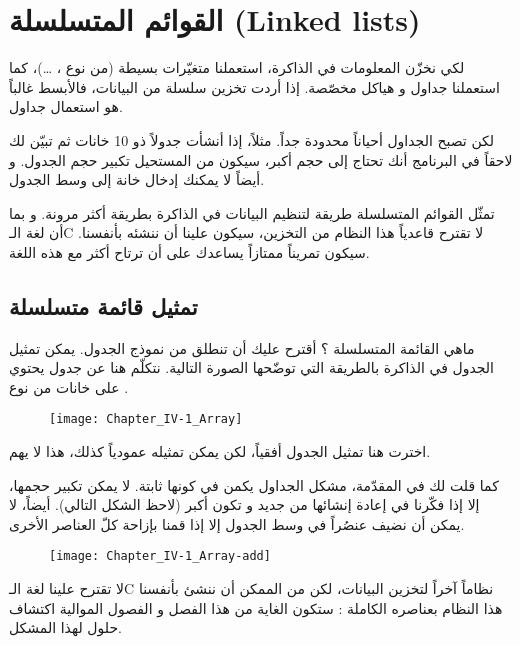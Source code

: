 \chapter{القوائم المتسلسلة (\textenglish{Linked lists})}

لكي نخزّن المعلومات في الذاكرة، استعملنا متغيّرات بسيطة (من نوع
،  \dots)،
كما استعملنا جداول و هياكل مخصّصة. إذا أردت تخزين سلسلة من البيانات، فالأبسط غالباً هو استعمال جداول. 

لكن تصبح الجداول أحياناً محدودة جداً. مثلاً، إذا أنشأت جدولاً ذو 10 خانات ثم تبيّن لك لاحقاً في البرنامج أنك تحتاج إلى حجم أكبر، سيكون من المستحيل تكبير حجم الجدول. و أيضاً لا يمكنك إدخال خانة إلى وسط الجدول.

تمثّل القوائم المتسلسلة طريقة لتنظيم البيانات في الذاكرة بطريقة أكثر مرونة. و بما أن لغة الـ\textenglish{C}
لا تقترح قاعدياً هذا النظام من التخزين، سيكون علينا أن ننشئه بأنفسنا. سيكون تمريناً ممتازاً يساعدك على أن ترتاح أكثر مع هذه اللغة.

\section{تمثيل قائمة متسلسلة}

ماهي القائمة المتسلسلة ؟ أقترح عليك أن تنطلق من نموذج الجدول. يمكن تمثيل الجدول في الذاكرة بالطريقة التي توضّحها الصورة التالية. نتكلّم هنا عن جدول يحتوي على خانات من نوع
.

\begin{figure}[H]
	\centering
	\texttt{[image: Chapter\_IV-1\_Array]}
\end{figure}

\begin{information}
اخترت هنا تمثيل الجدول أفقياً، لكن يمكن تمثيله عمودياً كذلك، هذا لا يهم.
\end{information}


كما قلت لك في المقدّمة، مشكل الجداول يكمن في كونها ثابتة. لا يمكن تكبير حجمها، إلا إذا فكّرنا في إعادة إنشائها من جديد و تكون أكبر (لاحظ الشكل التالي). أيضاً، لا يمكن أن نضيف عنصُراً في وسط الجدول إلا إذا قمنا بإزاحة كلّ العناصر الأخرى.

\begin{figure}[H]
	\centering
	\texttt{[image: Chapter\_IV-1\_Array-add]}
\end{figure}

لا تقترح علينا لغة الـ\textenglish{C}
نظاماً آخراً لتخزين البيانات، لكن من الممكن أن ننشئ بأنفسنا هذا النظام بعناصره الكاملة : ستكون الغاية من هذا الفصل و الفصول الموالية اكتشاف حلول لهذا المشكل.

